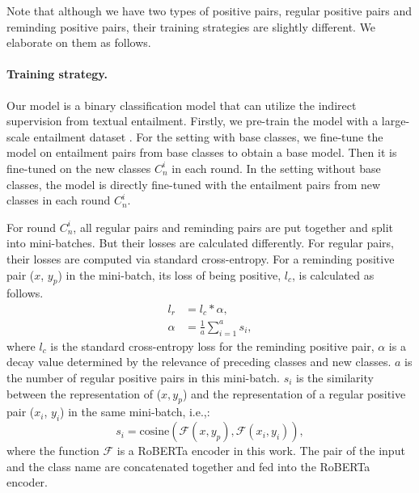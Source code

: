 \documentclass[11pt]{article}
\begin{document}
Note that although we have two types of positive pairs, regular positive pairs and reminding positive pairs, their training strategies are slightly different. We elaborate on them as follows.
\fi

\paragraph{Training strategy.} 
Our model is a binary classification model that can utilize the indirect supervision from textual entailment. Firstly, we pre-train the model with a large-scale entailment dataset \cite{williams2018broad}. For the setting with base classes, we fine-tune the model on entailment pairs from base classes to obtain a base model. Then it is fine-tuned on the new classes $C_n^i$ in each round. 
In the setting without base classes, the model is directly fine-tuned with the entailment pairs from new classes in each round $C_n^i$.


\iffalse
For round $C_n^i$, all regular pairs and reminding pairs are put together and split into mini-batches. But their losses are calculated differently. For regular pairs, their losses are computed via standard cross-entropy. For a reminding positive pair ($x$, $y_p$) in the mini-batch, its loss of being positive, $l_c$, is calculated as follows.
\begin{align}\label{eq:lossdecay}
    l_r &= l_c*\alpha, \\
    \alpha &= \frac{1}{a}\sum_{i=1}^a s_i,
\end{align}
where $l_c$ is the standard cross-entropy loss for the reminding positive pair,  $\alpha$ is a decay value determined by the relevance of preceding classes and new classes. $a$ is the number of regular positive pairs in this mini-batch. $s_i$ is the similarity between the representation of ($x, y_p$) and the representation of a regular positive pair ($x_i$, $y_i$) in the same mini-batch, i.e.,:
\begin{equation}
    s_i = \mathrm{cosine}(\mathcal{F}(x, y_p), \mathcal{F}(x_i, y_i)),
\end{equation}
where the function $\mathcal{F}$ is a RoBERTa \cite{liu2019roberta} encoder in this work. The pair of the input and the class name are concatenated together and fed into the RoBERTa encoder.
\end{document}
